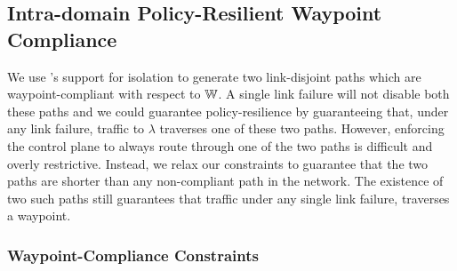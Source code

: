 







\subsection{Intra-domain Policy-Resilient Waypoint Compliance}\label{sec:ospfwaypoint}
We use \genesis's
support for isolation to generate two link-disjoint paths
which are waypoint-compliant with respect to $\mathbb{W}$. A single link
failure will not disable both these paths
and we could guarantee policy-resilience by 
guaranteeing that, under any link failure,
traffic to $\lambda$ 
traverses one of these two paths. However, enforcing the control plane to 
always route through one of the two paths is difficult and overly 
restrictive. 
Instead, we relax our constraints to guarantee that
the two paths are shorter than any non-compliant path in 
the network. The existence of two such paths still guarantees that 
traffic
under any single link failure,
 traverses a waypoint. 



\subsubsection{Waypoint-Compliance Constraints} \hspace*{4mm}


